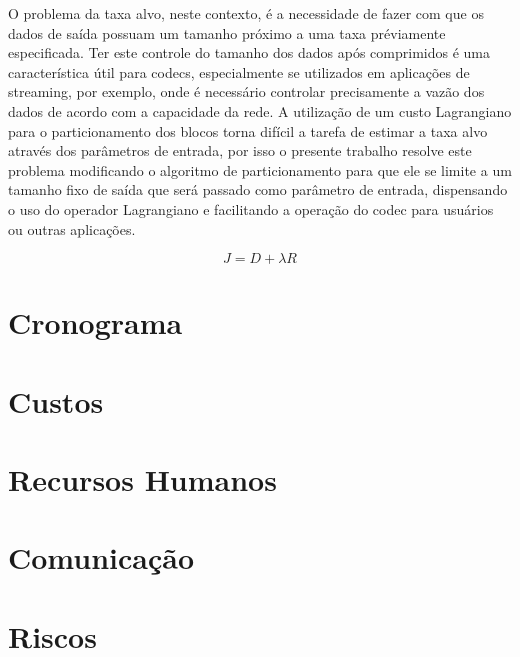     O problema da taxa alvo, neste contexto, é a necessidade de fazer com que os dados de saída possuam um tamanho próximo a uma taxa préviamente
    especificada. Ter este controle do tamanho dos dados após comprimidos é uma característica útil para codecs, especialmente se utilizados em
    aplicações de streaming, por exemplo, onde é necessário controlar precisamente a vazão dos dados de acordo com a capacidade da rede. A utilização
    de um custo Lagrangiano para o particionamento dos blocos torna difícil a tarefa de estimar a taxa alvo através dos parâmetros de entrada, por isso
    o presente trabalho resolve este problema modificando o algoritmo de particionamento para que ele se limite a um tamanho fixo de saída que será 
    passado como parâmetro de entrada, dispensando o uso do operador Lagrangiano e facilitando a operação do codec para usuários ou outras aplicações.

\begin{equation}
    \label{eqn:lagrangian_cost}
    J = D + \lambda R
\end{equation}





\section{Cronograma}

\section{Custos}

\section{Recursos Humanos}

\section{Comunicação}

\section{Riscos}